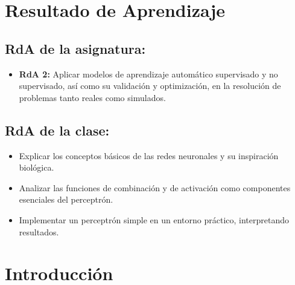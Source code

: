 \documentclass[a4,11pt]{aleph-notas}
\begin{document}
\encabezado


\section*{Resultado de Aprendizaje}

\subsection*{RdA de la asignatura:}
\begin{itemize}[leftmargin=*]
    \item \textbf
    {RdA 2:} Aplicar modelos de aprendizaje automático supervisado y no supervisado, así como su validación y optimización, en la resolución de problemas tanto reales como simulados.
\end{itemize}

\subsection*{RdA de la clase:}
\begin{itemize}[leftmargin=*]
    \item Explicar los conceptos básicos de las redes neuronales y su inspiración biológica.
    \item Analizar las funciones de combinación y de activación como componentes esenciales del perceptrón.
    \item Implementar un perceptrón simple en un entorno práctico, interpretando resultados.
\end{itemize}

\section*{Introducción}
\end{document}
